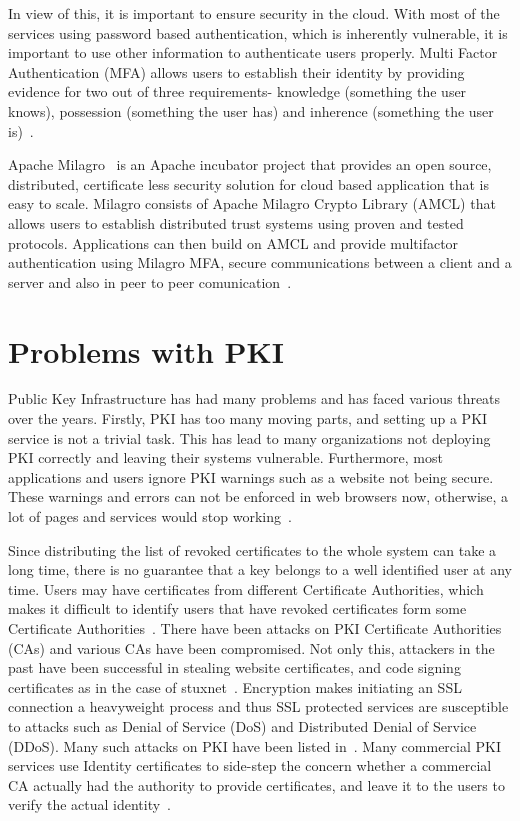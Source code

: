 In view of this, it is important to ensure security in the cloud. With
most of the services using password based authentication, which is
inherently vulnerable, it is important to use other information to
authenticate users properly. Multi Factor Authentication (MFA) allows
users to establish their identity by providing evidence for two out of
three requirements- knowledge (something the user knows), possession
(something the user has) and inherence (something the user
is)~\cite{centrify-mfa}.

Apache Milagro~\cite{milagro-website} is an Apache incubator project
that provides an open source, distributed, certificate less security
solution for cloud based application that is easy to scale. Milagro
consists of Apache Milagro Crypto Library (AMCL) that allows users to
establish distributed trust systems using proven and tested
protocols. Applications can then build on AMCL and provide multifactor
authentication using Milagro MFA, secure communications between a
client and a server and also in peer to peer
comunication~\cite{milagro-docs-overview}.



\section{Problems with PKI}
Public Key Infrastructure has had many problems and has faced various
threats over the years.  Firstly, PKI has too many moving parts, and
setting up a PKI service is not a trivial task. This has lead to many
organizations not deploying PKI correctly and leaving their systems
vulnerable. Furthermore, most applications and users ignore PKI
warnings such as a website not being secure. These warnings and errors
can not be enforced in web browsers now, otherwise, a lot of pages and
services would stop working~\cite{cso-pki-problems}.

Since distributing the list of revoked certificates to the whole system
can take a long time, there is no guarantee that a key belongs to a
well identified user at any time. Users may have certificates from
different Certificate Authorities, which makes it difficult to
identify users that have revoked certificates form some Certificate
Authorities~\cite{distlab-pki-problems}.  There have been attacks on
PKI Certificate Authorities (CAs) and various CAs have been
compromised. Not only this, attackers in the past have been successful
in stealing website certificates, and code signing certificates as in
the case of stuxnet~\cite{securityweek-ssl-threats}. Encryption makes
initiating an SSL connection a heavyweight process and thus SSL
protected services are susceptible to attacks such as Denial of
Service (DoS) and Distributed Denial of Service (DDoS). Many such
attacks on PKI have been listed in~\cite{cacert-wiki-pki-history}.
Many commercial PKI services use Identity certificates to side-step
the concern whether a commercial CA actually had the authority to
provide certificates, and leave it to the users to verify the actual
identity~\cite{ten-pki-risks}.

